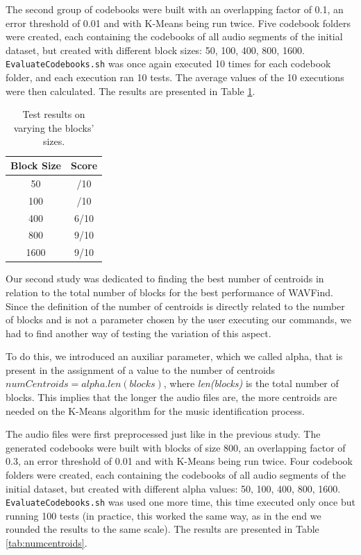 \documentclass[12pt]{article}
\begin{document}
The second group of codebooks were built with an overlapping factor of 0.1, an 
error threshold of 0.01 and with K-Means being run twice.
Five codebook folders were created, each containing the codebooks of all audio
segments of the initial dataset, but created with different block sizes:
50, 100, 400, 800, 1600. 
\texttt{EvaluateCodebooks.sh} was once again executed 10 times for each codebook
folder, and each execution ran 10 tests.
The average values of the 10 executions were then calculated.
The results are presented in Table \ref{tab:blockSize}.

\begin{table}[H]
  \begin{center}
    \begin{tabular}{c|c}
      \textbf{Block Size} & \textbf{Score}\\
      \hline
      50 & /10\\
      100 & /10\\
      400 & 6/10\\
      800 & 9/10\\
      1600 & 9/10\\
    \end{tabular}
  \end{center}
  \caption{Test results on varying the blocks' sizes.}
  \label{tab:blockSize}
\end{table}

Our second study was dedicated to finding the best number of centroids in relation
to the total number of blocks for the best performance of WAVFind.
Since the definition of the number of centroids is directly related to the number
of blocks and is not a parameter chosen by the user executing our commands,
we had to find another way of testing the variation of this aspect.

To do this, we introduced an auxiliar parameter, which we called alpha, that is 
present in the assignment of a value to the number of centroids 
$numCentroids = alpha . len(blocks)$, where {\it len(blocks)\/} is the total 
number of blocks.
This implies that the longer the audio files are, the more centroids are needed
on the K-Means algorithm for the music identification process.

The audio files were first preprocessed just like in the previous study.
The generated codebooks were built with blocks of size 800, an overlapping 
factor of 0.3, an error threshold of 0.01 and with K-Means being run twice.
Four codebook folders were created, each containing the codebooks of all audio
segments of the initial dataset, but created with different alpha values:
50, 100, 400, 800, 1600.
\texttt{EvaluateCodebooks.sh} was used one more time, this time executed only 
once but running 100 tests (in practice, this worked the same way, as in the end 
we rounded the results to the same scale).
The results are presented in Table \ref{tab:numcentroids}.
\end{document}
